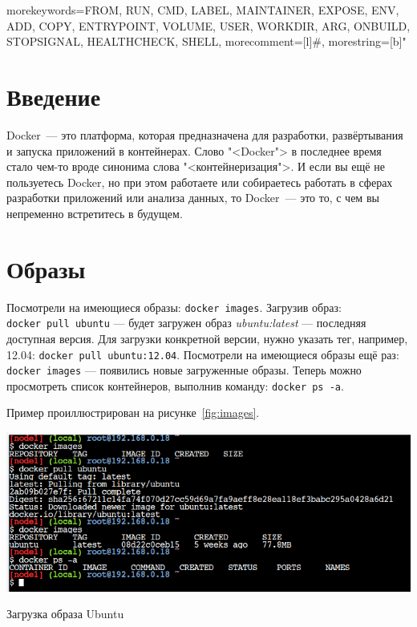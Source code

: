 \graphicspath{{./third/img/}}
{
  morekeywords={FROM, RUN, CMD, LABEL, MAINTAINER, EXPOSE, ENV, ADD, COPY,
    ENTRYPOINT, VOLUME, USER, WORKDIR, ARG, ONBUILD, STOPSIGNAL, HEALTHCHECK,
    SHELL},
  morecomment=[l]{\#},
  morestring=[b]"
}

\section*{\LARGE Введение}
Docker~--- это платформа, которая предназначена для разработки,
развёртывания и запуска приложений в контейнерах.
Слово "<Docker"> в последнее время стало чем-то вроде синонима слова
"<контейнеризация">. И если вы ещё не пользуетесь Docker, но при этом
работаете или собираетесь работать в сферах разработки приложений или
анализа данных, то Docker~--- это то, с чем вы непременно встретитесь
в будущем.

\clearpage

\section{Образы}
Посмотрели на имеющиеся образы: \texttt{docker~images}.
Загрузив образ: \texttt{docker~pull~ubuntu} --- будет загружен образ
\textit{ubuntu:latest} --- последняя доступная версия.
Для загрузки конкретной версии, нужно указать тег, например, 12.04:
\texttt{docker~pull~ubuntu:12.04}. Посмотрели на имеющиеся образы ещё раз:
\texttt{docker~images} --- появились новые загруженные
образы. Теперь можно просмотреть список контейнеров,
выполнив команду: \texttt{docker~ps~-a}.\par
Пример проиллюстрирован на рисунке~\ref{fig:images}.

\begin{image}
	\includegraphics[width=1\textwidth]{Screenshot from 2023-04-15 15-17-36}
	\caption{Загрузка образа Ubuntu}
	\label{fig:images}
\end{image}


